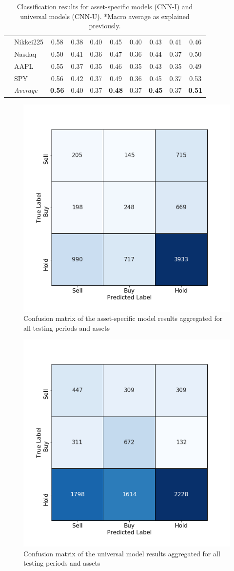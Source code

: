\documentclass[11pt, a4paper]{article}
\begin{document}
\begin{table}[H]
\begin{tabular}{l|l|cc|cc|cc|cc}
& Nikkei225        & 0.58          & 0.38 & 0.40 & 0.45          & 0.40 & 0.43          & 0.41 & 0.46          \\
& Nasdaq           & 0.50          & 0.41 & 0.36 & 0.47          & 0.36 & 0.44          & 0.37 & 0.50          \\
& AAPL             & 0.55          & 0.37 & 0.35 & 0.46          & 0.35 & 0.43          & 0.35 & 0.49          \\
& SPY              & 0.56          & 0.42 & 0.37 & 0.49          & 0.36 & 0.45          & 0.37 & 0.53          \\ \cline{2-10}
& \textit{Average} & \textbf{0.56} & 0.40 & 0.37 & \textbf{0.48} & 0.37 & \textbf{0.45} & 0.37 & \textbf{0.51}
\end{tabular}
\caption{Classification results for asset-specific models (CNN-I) and universal models (CNN-U). *Macro average as explained previously.}
\label{tbl:ClassRes}
\end{table}

\begin{figure}[H]
    \centering
    \includegraphics[width=.6\textwidth]{images/CMs/CM_indiv_aggreg.png}
    \caption{Confusion matrix of the asset-specific model results aggregated for all testing periods and assets}
    \label{fig:CMAggrI}
\end{figure}

\begin{figure}[H]
    \centering
    \includegraphics[width=.6\textwidth]{images/CMs/CM_univ_aggreg.png}
    \caption{Confusion matrix of the universal model results aggregated for all testing periods and assets}
    \label{fig:CMAggrU}
\end{figure}
\end{document}

